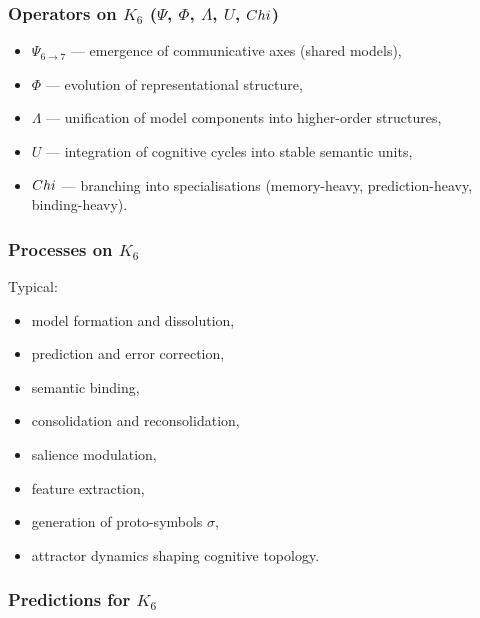 \subsubsection{Operators on \texorpdfstring{$K_6$}{K_6} (\texorpdfstring{$\Psi$}{\Psi}, \texorpdfstring{$\Phi$}{\Phi}, \texorpdfstring{$\Lambda$}{\Lambda}, \texorpdfstring{$U$}{U}, \texorpdfstring{$Chi$}{\Chi})}

\begin{itemize}
    \item $\Psi_{6\to7}$ — emergence of communicative axes (shared models),
    \item $\Phi$ — evolution of representational structure,
    \item $\Lambda$ — unification of model components into higher-order structures,
    \item $U$ — integration of cognitive cycles into stable semantic units,
    \item $Chi$ — branching into specialisations (memory-heavy, prediction-heavy, binding-heavy).
\end{itemize}

\subsubsection{Processes on \texorpdfstring{$K_6$}{K_6}}

Typical:
\begin{itemize}
    \item model formation and dissolution,
    \item prediction and error correction,
    \item semantic binding,
    \item consolidation and reconsolidation,
    \item salience modulation,
    \item feature extraction,
    \item generation of proto-symbols $\sigma$,
    \item attractor dynamics shaping cognitive topology.
\end{itemize}

\subsubsection{Predictions for \texorpdfstring{$K_6$}{K_6}}

